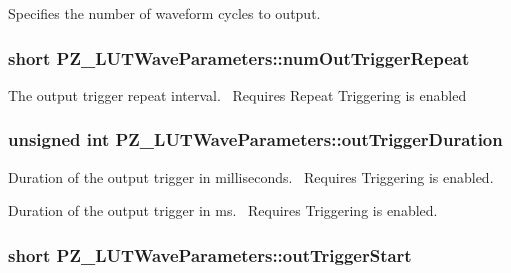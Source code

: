 Specifies the number of waveform cycles to output. 

\subsubsection[{\texorpdfstring{num\+Out\+Trigger\+Repeat}{numOutTriggerRepeat}}]{\setlength{\rightskip}{0pt plus 5cm}short P\+Z\+\_\+\+L\+U\+T\+Wave\+Parameters\+::num\+Out\+Trigger\+Repeat}\hypertarget{struct_p_z___l_u_t_wave_parameters_ab741cc806b9f66a2f86eeec057cfe102}{}\label{struct_p_z___l_u_t_wave_parameters_ab741cc806b9f66a2f86eeec057cfe102}


The output trigger repeat interval.~\newline
 Requires Repeat Triggering is enabled 

\subsubsection[{\texorpdfstring{out\+Trigger\+Duration}{outTriggerDuration}}]{\setlength{\rightskip}{0pt plus 5cm}unsigned int P\+Z\+\_\+\+L\+U\+T\+Wave\+Parameters\+::out\+Trigger\+Duration}\hypertarget{struct_p_z___l_u_t_wave_parameters_ae6302f2ebf0b3c1056109bd00fcdc855}{}\label{struct_p_z___l_u_t_wave_parameters_ae6302f2ebf0b3c1056109bd00fcdc855}


Duration of the output trigger in milliseconds.~\newline
 Requires Triggering is enabled. 

Duration of the output trigger in ms.~\newline
 Requires Triggering is enabled. 
\subsubsection[{\texorpdfstring{out\+Trigger\+Start}{outTriggerStart}}]{\setlength{\rightskip}{0pt plus 5cm}short P\+Z\+\_\+\+L\+U\+T\+Wave\+Parameters\+::out\+Trigger\+Start}\hypertarget{struct_p_z___l_u_t_wave_parameters_a0595ba5f0fe25c63e2f944cc47788fc7}{}\label{struct_p_z___l_u_t_wave_parameters_a0595ba5f0fe25c63e2f944cc47788fc7}



